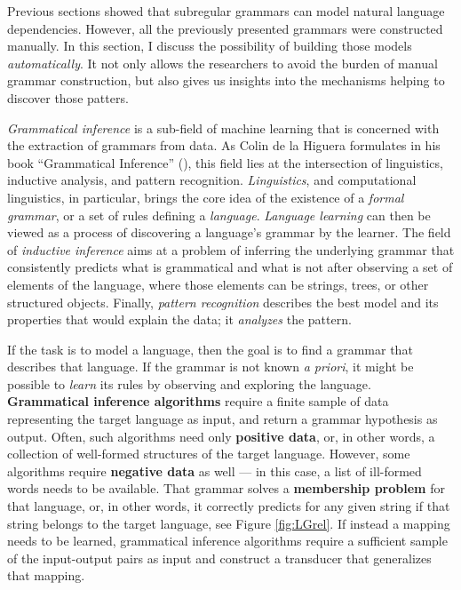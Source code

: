 Previous sections showed that subregular grammars can model natural language dependencies.
However, all the previously presented grammars were constructed manually.
In this section, I discuss the possibility of building those models \emph{automatically}.
It not only allows the researchers to avoid the burden of manual grammar construction, but also gives us insights into the mechanisms helping to discover those patters.


\emph{Grammatical inference} is a sub-field of machine learning 
that is concerned with the extraction of grammars from data.
As Colin de la Higuera formulates in his book ``Grammatical Inference'' (\citeyear{DeLaHiguera2010}), this field lies at the intersection of linguistics, inductive analysis, and pattern recognition.
\emph{Linguistics}, and computational linguistics, in particular, brings the core idea of the existence of a \emph{formal grammar}, or a set of rules defining a \emph{language}.
\emph{Language learning} can then be viewed as a process of discovering a language's grammar by the learner.
The field of \emph{inductive inference} aims at a problem of inferring the underlying grammar that consistently predicts what is grammatical and what is not after observing a set of elements of the language, where those elements can be strings, trees, or other structured objects.
Finally, \emph{pattern recognition} describes the best model and its properties that would explain the data; it \emph{analyzes} the pattern.

If the task is to model a language, then the goal is to find a grammar that describes that language.
If the grammar is not known \emph{a priori}, it might be possible to \emph{learn} its rules by observing and exploring the language.
\textbf{Grammatical inference algorithms} require a finite sample of data representing the target language as input, and return a grammar hypothesis as output.
Often, such algorithms need only \textbf{positive data}, or, in other words, a collection of well-formed structures of the target language.
However, some algorithms require \textbf{negative data} as well --- in this case, a list of ill-formed words needs to be available.
That grammar solves a \textbf{membership problem} for that language, or, in other words, it correctly predicts for any given string if that string belongs to the target language, see Figure \ref{fig:LGrel}.
If instead a mapping needs to be learned, grammatical inference algorithms require a sufficient sample of the input-output pairs as input and construct a transducer that generalizes that mapping.

